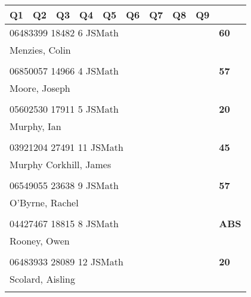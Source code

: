 \documentclass[a4paper,12pt]{article}
\begin{document}
\begin{tabular}{
   |p{9mm}|
    p{9mm}|
    p{9mm}|
    p{9mm}|
    p{9mm}|
    p{9mm}|
    p{9mm}|
    p{9mm}|
    p{9mm}|
    p{9mm}|}
\hline\hline
Q1 & Q2 & Q3 & Q4 & Q5 & Q6 & Q7 & Q8 & Q9 &     \\
\hline\hline
\multicolumn{9}{|l|}{06483399 18482 6 JSMath} & \textbf{60} \\
\hline
\multicolumn{10}{|l|}{Menzies, Colin} \\
\hline
   \vrule height8mm width0pt depth2mm 
      &    &    &    &    &    &    &    &    &     \\
\hline\hline
\multicolumn{9}{|l|}{06850057 14966 4 JSMath} & \textbf{57} \\
\hline
\multicolumn{10}{|l|}{Moore, Joseph} \\
\hline
   \vrule height8mm width0pt depth2mm 
      &    &    &    &    &    &    &    &    &     \\
\hline\hline
\multicolumn{9}{|l|}{05602530 17911 5 JSMath} & \textbf{20} \\
\hline
\multicolumn{10}{|l|}{Murphy, Ian} \\
\hline
   \vrule height8mm width0pt depth2mm 
      &    &    &    &    &    &    &    &    &     \\
\hline\hline
\multicolumn{9}{|l|}{03921204 27491 11 JSMath} & \textbf{45} \\
\hline
\multicolumn{10}{|l|}{Murphy Corkhill, James} \\
\hline
   \vrule height8mm width0pt depth2mm 
      &    &    &    &    &    &    &    &    &     \\
\hline\hline
\multicolumn{9}{|l|}{06549055 23638 9 JSMath} & \textbf{57} \\
\hline
\multicolumn{10}{|l|}{O'Byrne, Rachel} \\
\hline
   \vrule height8mm width0pt depth2mm 
      &    &    &    &    &    &    &    &    &     \\
\hline\hline
\multicolumn{9}{|l|}{04427467 18815 8 JSMath} & \textbf{ABS} \\
\hline
\multicolumn{10}{|l|}{Rooney, Owen} \\
\hline
   \vrule height8mm width0pt depth2mm 
      &    &    &    &    &    &    &    &    &     \\
\hline\hline
\multicolumn{9}{|l|}{06483933 28089 12 JSMath} & \textbf{20} \\
\hline
\multicolumn{10}{|l|}{Scolard, Aisling} \\
\hline
   \vrule height8mm width0pt depth2mm 

\end{tabular}
\end{document}
